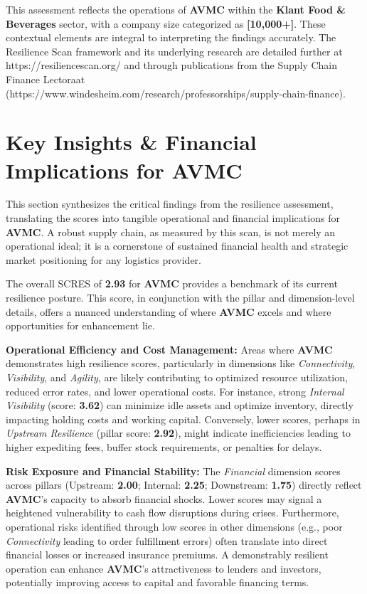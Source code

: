 \documentclass[
  oneside,
  open=any,
  fontsize=11pt]{scrbook}
\begin{document}
This assessment reflects the operations of \textbf{AVMC} within the
\textbf{Klant Food \& Beverages} sector, with a company size categorized
as \textbf{{[}10,000+{]}}. These contextual elements are integral to
interpreting the findings accurately. The Resilience Scan framework and
its underlying research are detailed further at
https://resiliencescan.org/ and through publications from the Supply
Chain Finance Lectoraat
(https://www.windesheim.com/research/professorships/supply-chain-finance).

\chapter{Key Insights \& Financial Implications for
AVMC}\label{key-insights-financial-implications-for-avmc}

This section synthesizes the critical findings from the resilience
assessment, translating the scores into tangible operational and
financial implications for \textbf{AVMC}. A robust supply chain, as
measured by this scan, is not merely an operational ideal; it is a
cornerstone of sustained financial health and strategic market
positioning for any logistics provider.

The overall SCRES of \textbf{2.93} for \textbf{AVMC} provides a
benchmark of its current resilience posture. This score, in conjunction
with the pillar and dimension-level details, offers a nuanced
understanding of where \textbf{AVMC} excels and where opportunities for
enhancement lie.

\textbf{Operational Efficiency and Cost Management:} Areas where
\textbf{AVMC} demonstrates high resilience scores, particularly in
dimensions like \emph{Connectivity}, \emph{Visibility}, and
\emph{Agility}, are likely contributing to optimized resource
utilization, reduced error rates, and lower operational costs. For
instance, strong \emph{Internal Visibility} (score: \textbf{3.62}) can
minimize idle assets and optimize inventory, directly impacting holding
costs and working capital. Conversely, lower scores, perhaps in
\emph{Upstream Resilience} (pillar score: \textbf{2.92}), might indicate
inefficiencies leading to higher expediting fees, buffer stock
requirements, or penalties for delays.

\textbf{Risk Exposure and Financial Stability:} The \emph{Financial}
dimension scores across pillars (Upstream: \textbf{2.00}; Internal:
\textbf{2.25}; Downstream: \textbf{1.75}) directly reflect
\textbf{AVMC}'s capacity to absorb financial shocks. Lower scores may
signal a heightened vulnerability to cash flow disruptions during
crises. Furthermore, operational risks identified through low scores in
other dimensions (e.g., poor \emph{Connectivity} leading to order
fulfillment errors) often translate into direct financial losses or
increased insurance premiums. A demonstrably resilient operation can
enhance \textbf{AVMC}'s attractiveness to lenders and investors,
potentially improving access to capital and favorable financing terms.
\end{document}
